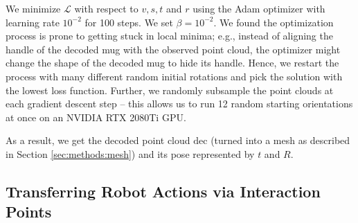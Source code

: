 \documentclass{article}
\begin{document}
We minimize $\mathcal{L}$ with respect to $v, s, t$ and $r$ using the Adam optimizer \cite{kingma17adam} with learning rate $10^{-2}$ for 100 steps. We set $\beta=10^{-2}$. We found the optimization process is prone to getting stuck in local minima; e.g., instead of aligning the handle of the decoded mug with the observed point cloud, the optimizer might change the shape of the decoded mug to hide its handle. Hence, we restart the process with many different random initial rotations and pick the solution with the lowest loss function. Further, we randomly subsample the point clouds at each gradient descent step -- this allows us to run 12 random starting orientations at once on an NVIDIA RTX 2080Ti GPU.

As a result, we get the decoded point cloud $\mathrm{dec}$ (turned into a mesh as described in Section \ref{sec:methods:mesh}) and its pose represented by $t$ and $R$.

\subsection{Transferring Robot Actions via Interaction Points}
\end{document}
